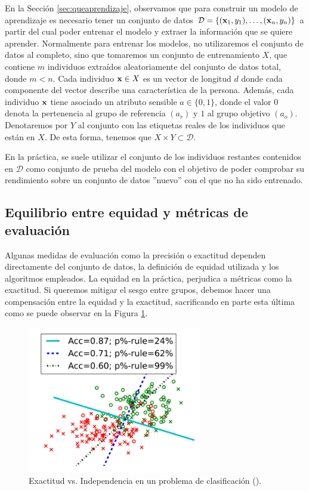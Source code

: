 \documentclass[oneside,openright,titlepage,numbers=noenddot,openany,headinclude,footinclude=true,
cleardoublepage=empty,abstractoff,BCOR=5mm,paper=a4,fontsize=12pt,main=spanish]{scrreprt}
\begin{document}
En la Sección \ref{sec:queaprendizaje}, observamos que para construir un modelo de aprendizaje es necesario tener un conjunto de datos $\mathcal{D}=\{(\textbf{x}_1,y_1),\dots,(\textbf{x}_n,y_n)\}$ a partir del cual poder entrenar el modelo y extraer la información que se quiere aprender. Normalmente para entrenar los modelos, no utilizaremos el conjunto de datos al completo, sino que tomaremos un conjunto de entrenamiento $X$, que contiene $m$  individuos extraídos aleatoriamente del conjunto de datos total, donde $m < n$. Cada individuo $\textbf{x} \in X$ es un vector de longitud $d$ donde cada componente del vector describe una característica de la persona. Además, cada individuo $\textbf{x}$ tiene asociado un atributo sensible $a\in \{0,1\}$, donde el valor $0$ denota la pertenencia al grupo de referencia $(a_r)$ y $1$ al grupo objetivo $(a_o)$. Denotaremos por $Y$ al conjunto con las etiquetas reales de los individuos que están en $X$. De esta forma, tenemos que $X \times Y \subset \mathcal{D}$. 

En la práctica, se suele utilizar el conjunto de los individuos restantes contenidos en $\mathcal{D}$ como conjunto de prueba del modelo con el objetivo de poder comprobar su rendimiento sobre un conjunto de datos ''nuevo'' con el que no ha sido entrenado. 

\subsection{Equilibrio entre equidad y métricas de evaluación}

Algunas medidas de evaluación como la precisión o exactitud dependen directamente del conjunto de datos, la definición de equidad utilizada y los algoritmos empleados. La equidad en la práctica, perjudica a métricas como la exactitud. Si queremos mitigar el sesgo entre grupos, debemos hacer una compensación entre la equidad y la exactitud, sacrificando en parte esta última como se puede observar en la Figura \ref{fig:tradeoff}.\\

\begin{figure}[h]
	\centering
	\includegraphics[width=7.6cm]{accuracyeq.png}
	\caption{Exactitud vs. Independencia en un problema de clasificación (\cite{constraints2017}).}
    \label{fig:tradeoff}
\end{figure}
\end{document}
